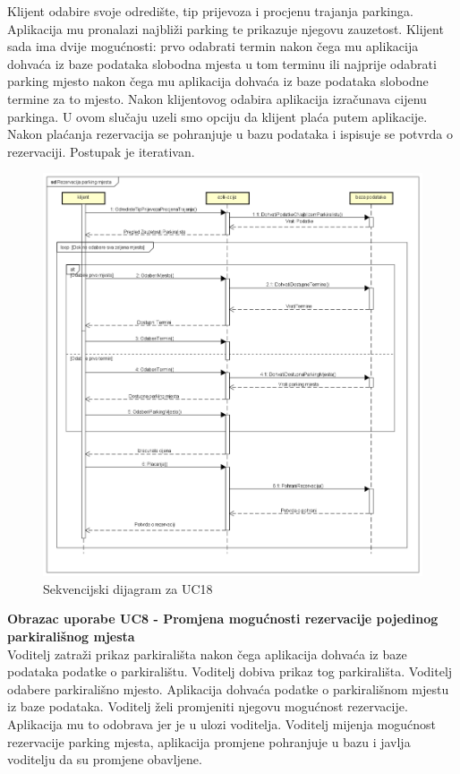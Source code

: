 \begin{packed_item}
				Klijent odabire svoje odredište, tip prijevoza i procjenu trajanja parkinga. Aplikacija mu pronalazi najbliži parking te prikazuje njegovu zauzetost. Klijent sada ima dvije mogućnosti: prvo odabrati termin nakon čega mu aplikacija dohvaća iz baze podataka slobodna mjesta u tom terminu ili najprije odabrati parking mjesto nakon čega mu aplikacija dohvaća iz baze podataka slobodne termine za to mjesto. Nakon klijentovog odabira aplikacija izračunava cijenu parkinga. U ovom slučaju uzeli smo opciju da klijent plaća putem aplikacije. Nakon plaćanja rezervacija se pohranjuje u bazu podataka i ispisuje se potvrda o rezervaciji. Postupak je iterativan. 
				\eject	
						
			 	\begin{figure}[H]
					\includegraphics[width=\textwidth]{slike/RezervacijaParkingMjesta.png} %
					\caption{Sekvencijski dijagram za UC18}
					\label{fig:rezarvacija}
				\end{figure}
				\eject	
				
				\textbf{Obrazac uporabe UC8 - Promjena mogućnosti rezervacije pojedinog parkirališnog mjesta}\\
				
				Voditelj zatraži prikaz parkirališta nakon čega aplikacija dohvaća iz baze podataka podatke o parkiralištu. Voditelj dobiva prikaz tog parkirališta. Voditelj odabere parkirališno mjesto. Aplikacija dohvaća podatke o parkirališnom mjestu iz baze podataka. Voditelj želi promjeniti njegovu mogućnost rezervacije. Aplikacija mu to odobrava jer je u ulozi voditelja. Voditelj mijenja mogućnost rezervacije parking mjesta, aplikacija promjene pohranjuje u bazu i javlja voditelju da su promjene obavljene. 
				

\end{packed_item}
